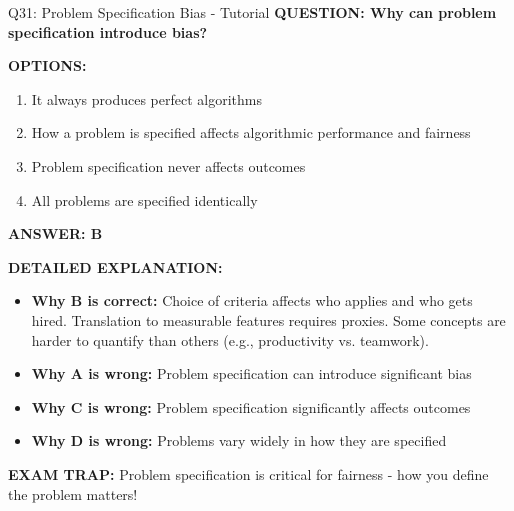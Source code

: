 \documentclass[8pt]{beamer}
\begin{document}
	\begin{frame}{Q31: Problem Specification Bias - Tutorial}
		\fontsize{6.5}{7.5}\selectfont
		\textbf{QUESTION: Why can problem specification introduce bias?}
		
		\vspace{0.1cm}
		\textbf{OPTIONS:}
		\begin{enumerate}
			\item It always produces perfect algorithms
			\item How a problem is specified affects algorithmic performance and fairness
			\item Problem specification never affects outcomes
			\item All problems are specified identically
		\end{enumerate}
		
		\vspace{0.1cm}
		\textcolor{myblue}{\textbf{ANSWER: B}}
		
		\vspace{0.1cm}
		\textbf{DETAILED EXPLANATION:}
		\begin{itemize}
			\item \textbf{Why B is correct:} Choice of criteria affects who applies and who gets hired. Translation to measurable features requires proxies. Some concepts are harder to quantify than others (e.g., productivity vs. teamwork).
			\item \textbf{Why A is wrong:} Problem specification can introduce significant bias
			\item \textbf{Why C is wrong:} Problem specification significantly affects outcomes
			\item \textbf{Why D is wrong:} Problems vary widely in how they are specified
		\end{itemize}
		
		\textcolor{myred}{\textbf{EXAM TRAP:}} Problem specification is \textcolor{myblue}{critical for fairness} - how you define the problem matters!
	\end{frame}
	
\end{document}
